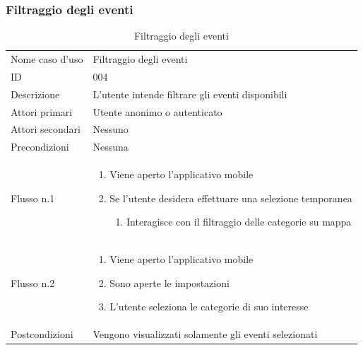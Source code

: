 \documentclass{article}
\begin{document}
\clearpage

\subsubsection{Filtraggio degli eventi}

\begin{table}[htbp]
    \label{tab:tabella_use_case004}
    \centering
    \begin{tabularx}{\textwidth}{| l | X |}
        \Xhline{2pt} %
        Nome caso d'uso & Filtraggio degli eventi \\
        \Xhline{2pt} %
        ID & 004 \\
        \hline
        Descrizione & L'utente intende filtrare gli eventi disponibili\\
        \hline
        Attori primari & Utente anonimo o autenticato\\
        \hline
        Attori secondari & Nessuno \\
        \hline
        Precondizioni & Nessuna \\
        \hline
        Flusso n.1 & 
        \begin{enumerate}[topsep=5pt,partopsep=0pt,parsep=0pt,itemsep=0pt,before=\vspace{-\baselineskip},after=\vspace{-\baselineskip}]                
            \item Viene aperto l'applicativo mobile
            \item Se l'utente desidera effettuare una selezione temporanea
            \begin{enumerate}[leftmargin=*, nosep]
                \item Interagisce con il filtraggio delle categorie su mappa
            \end{enumerate}
        \end{enumerate}
        \\
        \hline
        Flusso n.2 &
        \begin{enumerate}[topsep=5pt,partopsep=0pt,parsep=0pt,itemsep=0pt,before=\vspace{-\baselineskip},after=\vspace{-\baselineskip}]                
            \item Viene aperto l'applicativo mobile
            \item Sono aperte le impostazioni
            \item L'utente seleziona le categorie di suo interesse
        \end{enumerate}
        \\
        \hline
        Postcondizioni & Vengono visualizzati solamente gli eventi selezionati \\
        \hline
    \end{tabularx}
    \caption{Filtraggio degli eventi}
\end{table}
\end{document}
